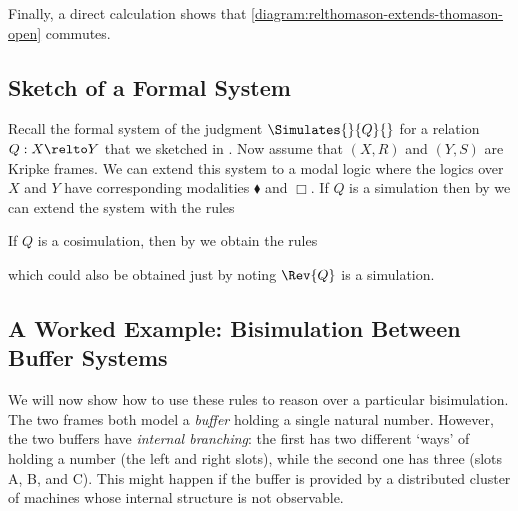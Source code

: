 Finally, a direct calculation shows that
\eqref{diagram:relthomason-extends-thomason-open} commutes.

\subsection{Sketch of a Formal System}

Recall the formal system of the judgment $\Simulates{}{Q}{}$ for a relation $Q :
X \relto Y$ that we sketched in . Now assume
that \((X, R)\) and \((Y, S)\) are Kripke frames. We can extend this system to a
modal logic where the logics over $X$ and $Y$ have corresponding modalities
$\blacklozenge$ and $\Box$. If $Q$ is a simulation then by
 we can extend the system with the rules
If $Q$ is a cosimulation, then by
 we
obtain the rules
which could also be obtained just by noting $\Rev{Q}$ is a
simulation.

\subsection{A Worked Example: Bisimulation Between Buffer Systems}

We will now show how to use these rules to reason over a particular
bisimulation. The two frames both model a \emph{buffer} holding a single natural
number. However, the two buffers have \emph{internal branching}: the first has
two different `ways' of holding a number (the left and right slots), while the
second one has three (slots A, B, and C). This might happen if the buffer is
provided by a distributed cluster of machines whose internal structure is not
observable.

